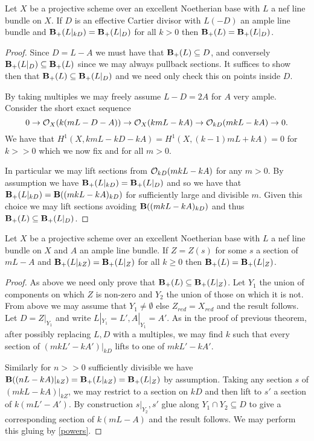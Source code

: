 \begin{lemma}
	Let $X$ be a projective scheme over an excellent Noetherian base with $L$ a nef line bundle on $X$. If $D$ is an effective Cartier divisor with $L(-D)$ an ample line bundle and $\BS(L|_{kD})=\BS(L|_{D})$ for all $k > 0$ then $\BS(L)=\BS(L|_{D})$.
\end{lemma}

\begin{proof}
	Since $D=L-A$ we must have that $\BS(L) \subseteq D$, and conversely $\BS(L|_{D}) \subseteq \BS(L)$ since we may always pullback sections. It suffices to show then that $\BS(L) \subseteq \BS(L|_{D})$ and we need only check this on points inside $D$.
	
	By taking multiples we may freely assume $L-D=2A$ for $A$ very ample. Consider the short exact sequence
	\[0 \to \ox(k(mL-D-A))\to \ox(kmL-kA) \to \ox[kD](mkL-kA) \to 0.\]
	We have that $H^{1}(X,kmL-kD-kA)=H^{1}(X,(k-1)mL+kA)=0$ for $k >>0$ which we now fix and for all $m >0$.
	
	In particular we may lift sections from $\ox[kD](mkL-kA)$ for any $m>0$. By assumption we have $\BS(L|_{kD})=\BS(L|_{D})$ and so we have that $\BS(L|_{kD})=\BB((mkL-kA)_{kD})$ for sufficiently large and divisible $m$. Given this choice we may lift sections avoiding $\BB((mkL-kA)_{kD})$ and thus $\BS(L) \subseteq \BS(L|_{D})$.
\end{proof}

\begin{lemma}\label{reduce}
	Let $X$ be a projective scheme over an excellent Noetherian base with $L$ a nef line bundle on $X$ and $A$ an ample line bundle. If $Z=Z(s)$ for some $s$ a section of $mL-A$ and $\BS(L|_{kZ})=\BS(L|_{Z})$ for all $k \geq 0$ then $\BS(L)=\BS(L|_{Z})$.
\end{lemma}

\begin{proof}
	As above we need only prove that $\BS(L)\subseteq \BS(L|_{Z})$.	Let $Y_{1}$ the union of components on which $Z$ is non-zero and $Y_{2}$ the union of those on which it is not. From above we may assume that $Y_{1} \neq \emptyset$ else $Z_{red}=X_{red}$ and the result follows. Let $D=Z|_{Y_{1}}$ and write $L|_{Y_{1}}=L', A|_{Y_{1}}=A'$. As in the proof of previous theorem, after possibly replacing $L,D$ with a multiples, we may find $k$ such that every section of $(mkL'-kA')|_{kD}$ lifts to one of $mkL'-kA'$. 
	
	Similarly for $n>>0$ sufficiently divisible we have $\mathbf{B}((nL-kA)|_{kZ})=\BS(L|_{kZ})=\BS(L|_{Z})$ by assumption. Taking any section $s$ of $(mkL-kA)|_{kZ}$, we may restrict to a section on $kD$ and then lift to $s'$ a section of $k(mL'-A')$. By construction $s|_{Y_{2}},s'$ glue along $Y_{1}\cap Y_{2}\subseteq D$ to give a corresponding section of $k(mL-A)$ and the result follows. We may perform this gluing by \autoref{powers}.
\end{proof}


